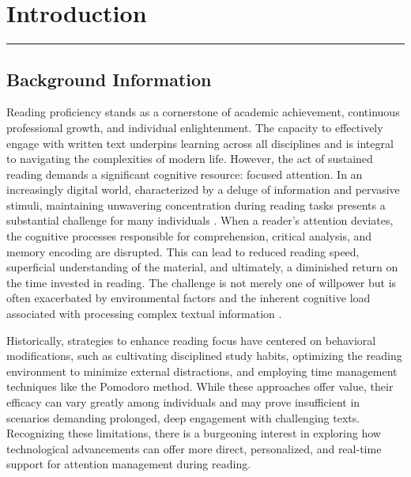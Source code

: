 \chapter{Introduction}
\vspace{-1.5cm}
\hspace{-1cm}\rule{19cm}{0.4pt} 

\normalsize

\section{Background Information}
Reading proficiency stands as a cornerstone of academic achievement, continuous professional growth, and individual enlightenment. The capacity to effectively engage with written text underpins learning across all disciplines and is integral to navigating the complexities of modern life. However, the act of sustained reading demands a significant cognitive resource: focused attention. In an increasingly digital world, characterized by a deluge of information and pervasive stimuli, maintaining unwavering concentration during reading tasks presents a substantial challenge for many individuals \cite{article}. When a reader's attention deviates, the cognitive processes responsible for comprehension, critical analysis, and memory encoding are disrupted. This can lead to reduced reading speed, superficial understanding of the material, and ultimately, a diminished return on the time invested in reading. The challenge is not merely one of willpower but is often exacerbated by environmental factors and the inherent cognitive load associated with processing complex textual information \cite{Ghosh_CognitiveLoadReading_2022}.

Historically, strategies to enhance reading focus have centered on behavioral modifications, such as cultivating disciplined study habits, optimizing the reading environment to minimize external distractions, and employing time management techniques like the Pomodoro method. While these approaches offer value, their efficacy can vary greatly among individuals and may prove insufficient in scenarios demanding prolonged, deep engagement with challenging texts. Recognizing these limitations, there is a burgeoning interest in exploring how technological advancements can offer more direct, personalized, and real-time support for attention management during reading.

